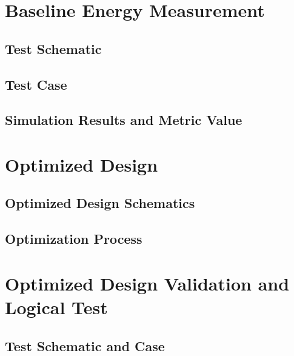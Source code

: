 \documentclass[12pt]{article}
\begin{document}
\newpage

\section{Baseline Energy Measurement}
\subsection{Test Schematic}



\newpage

\subsection{Test Case}



\newpage

\subsection{Simulation Results and Metric Value}



\newpage

\section{Optimized Design}
\subsection{Optimized Design Schematics}



\newpage

\subsection{Optimization Process}



\newpage

\section{Optimized Design Validation and Logical Test}
\subsection{Test Schematic and Case}
\end{document}
